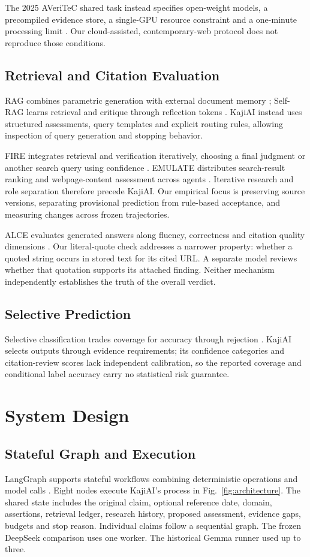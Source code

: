 \documentclass[conference]{IEEEtran}
\begin{document}
The 2025 AVeriTeC shared task instead specifies open-weight models, a precompiled evidence store, a single-GPU resource constraint and a one-minute processing limit \cite{sharedtask2025}. Our cloud-assisted, contemporary-web protocol does not reproduce those conditions.

\subsection{Retrieval and Citation Evaluation}
RAG combines parametric generation with external document memory \cite{rag}; Self-RAG learns retrieval and critique through reflection tokens \cite{selfrag}. KajiAI instead uses structured assessments, query templates and explicit routing rules, allowing inspection of query generation and stopping behavior.

FIRE integrates retrieval and verification iteratively, choosing a final judgment or another search query using confidence \cite{fire}. EMULATE distributes search-result ranking and webpage-content assessment across agents \cite{emulate}. Iterative research and role separation therefore precede KajiAI. Our empirical focus is preserving source versions, separating provisional prediction from rule-based acceptance, and measuring changes across frozen trajectories.

ALCE evaluates generated answers along fluency, correctness and citation quality dimensions \cite{alce}. Our literal-quote check addresses a narrower property: whether a quoted string occurs in stored text for its cited URL. A separate model reviews whether that quotation supports its attached finding. Neither mechanism independently establishes the truth of the overall verdict.

\subsection{Selective Prediction}
Selective classification trades coverage for accuracy through rejection \cite{selective}. KajiAI selects outputs through evidence requirements; its confidence categories and citation-review scores lack independent calibration, so the reported coverage and conditional label accuracy carry no statistical risk guarantee.

\section{System Design}
\subsection{Stateful Graph and Execution}
LangGraph supports stateful workflows combining deterministic operations and model calls \cite{langgraph}. Eight nodes execute KajiAI's process in Fig.~\ref{fig:architecture}. The shared state includes the original claim, optional reference date, domain, assertions, retrieval ledger, research history, proposed assessment, evidence gaps, budgets and stop reason. Individual claims follow a sequential graph. The frozen DeepSeek comparison uses one worker. The historical Gemma runner used up to three.
\end{document}
